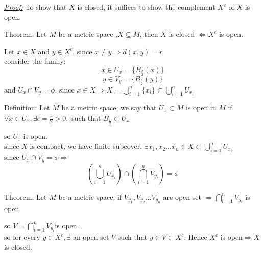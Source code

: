 \documentclass{book}
\begin{document}
\begin{tcolorbox}[enhanced,attach boxed title to top center={yshift=-3mm,yshifttext=-1mm},
colback=blue!5!white,colframe=blue!75!black,colbacktitle=red!80!black,
title=Exercise 42.2:,fonttitle=\bfseries,
boxed title style={size=small,colframe=red!50!black} ]
\textit{\color{blue}\underline{Proof:}}
To show that $X$ is closed, it suffices to show the complement $X^c$ of $X$ is open.
\begin{tcolorbox}[colback=red!5!white,colframe=red!75!black]
{\color{red}Theorem:}
Let $M$ be a metric space ,$X\subseteq M$, then $X$ is closed $\iff X^c$ is open.
\end{tcolorbox}
Let $x\in X$ and $y\in X^c$, since $x\neq y\Rightarrow d(x,y)=r$\\
consider the family:
$$x\in U_x=\{B_{\frac{r}{2}}(x)\}$$
$$y\in V_y=\{B_{\frac{r}{2}}(y)\}$$
and $U_x\cap V_y=\phi$, since $x\in X\Rightarrow X=\bigcup_{i=1}^{n}\{x_i\}\subset\bigcup_{i=1}^{n}U_{x_i}$
\begin{tcolorbox}[colback=red!5!white,colframe=red!75!black]
{\color{red}Definition:}
Let $M$ be a metric space, we say that $U_x\subset M$ is open in $M$ if $\forall x\in U_x,\exists 
\epsilon=\frac{r}{2}>0,$ such that 
$B_{\frac{r}{2}}\subset U_x$
\end{tcolorbox}
so $U_x$ is open.\\
since $X$ is compact, we have finite subcover, $\exists x_1,x_2...x_n\in X\subset \bigcup_{i=1}^{n}U_{x_i}$\\
since $U_x\cap V_y=\phi\Longrightarrow$
$$\left( \bigcup_{i=1}^{n}U_{x_i}\right) \cap \left( \bigcap_{i=1}^{n}V_{y_i}\right)=\phi $$
\begin{tcolorbox}[colback=red!5!white,colframe=red!75!black]
{\color{red}Theorem:}
Let $M$ be a metric space, if $V_{y_1},V_{y_2}...V_{y_n}$ are open set $\Rightarrow \bigcap_{i=1}^{n}V_{y_i}$ 
is open.
\end{tcolorbox}
so $V=\bigcap_{i=1}^{n}V_{y_i}$is open.\\
so for every $y\in X^c,\exists$ an open set $V$ such that $y \in V\subset X^c$, Hence $X^c$ is open$\Rightarrow 
X$ is closed.
\end{tcolorbox}

\end{document}
